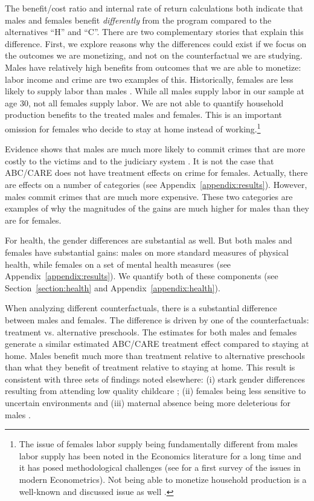 The benefit/cost ratio and internal rate of return calculations both indicate that males and females benefit \emph{differently} from the program compared to the alternatives ``H'' and ``C''. There are two complementary stories that explain this difference. First, we explore reasons why the differences could exist if we focus on the outcomes we are monetizing, and not on the counterfactual we are studying. Males have relatively high benefits from outcomes that we are able to monetize: labor income and crime are two examples of this. Historically, females are less likely to supply labor than males \citep{Jaumotte_2003_OECD}. While all males supply labor in our sample at age 30, not all females supply labor. We are not able to quantify household production benefits to the treated males and females. This is an important omission for females who decide to stay at home instead of working.\footnote{The issue of females labor supply being fundamentally different from males labor supply has been noted in the Economics literature for a long time and it has posed methodological challenges (see \citet{Killingsworth_Heckman_1986_FemaleLaborSupply} for a first survey of the issues in modern Econometrics). Not being able to monetize household production is a well-known and discussed issue as well \citep{Becker_1995_Housework_Bloomberg}.}

Evidence shows that males are much more likely to commit crimes that are more costly to the victims and to the judiciary system \citep{Cohen-Bowles_2010_Estimating-Cost-Crime,Gregg_etal_2015_SocialRealities_BOOK}. It is not the case that ABC/CARE does not have treatment effects on crime for females. Actually, there are effects on a number of categories (see Appendix~\ref{appendix:results}). However, males commit crimes that are much more expensive. These two categories are examples of why the magnitudes of the gains are much higher for males than they are for females.

For health, the gender differences are substantial as well. But both males and females have substantial gains: males on more standard measures of physical health, while females on a set of mental health measures (see Appendix~\ref{appendix:results}). We quantify both of these components (see Section~\ref{section:health} and Appendix~\ref{appendix:health}).

When analyzing different counterfactuals, there is a substantial difference between males and females. The difference is driven by one of the counterfactuals: treatment vs. alternative preschools. The estimates for both males and females generate a similar estimated ABC/CARE treatment effect compared to staying at home. Males benefit much more than treatment relative to alternative preschools than what they benefit of treatment relative to staying at home. This result is consistent with three sets of findings noted elsewhere: (i) stark gender differences resulting from attending low quality childcare \citep{Kottelenberg-Lehrer_2014_Gender-Effects,Baker_Gruber_Milligan_2015_Noncog_Defects}; (ii) females being less sensitive to uncertain environments \citep{Autor-etal_2015_Family-Disadvantage} and (iii) maternal absence being more deleterious for males \citep{Rutter_1972_Maternal-Deprivation}.

